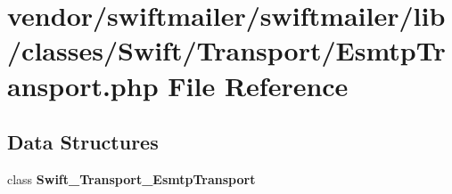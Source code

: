 \section{vendor/swiftmailer/swiftmailer/lib/classes/\+Swift/\+Transport/\+Esmtp\+Transport.php File Reference}
\label{_esmtp_transport_8php}
\subsection*{Data Structures}
\begin{DoxyCompactItemize}
\item 
class {\bf Swift\+\_\+\+Transport\+\_\+\+Esmtp\+Transport}
\end{DoxyCompactItemize}
